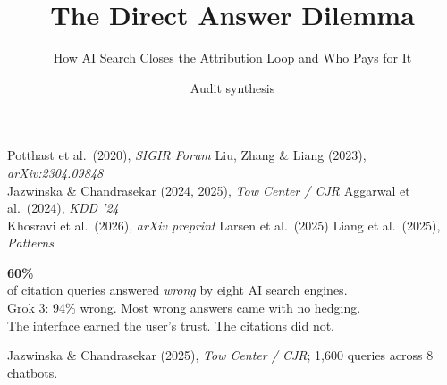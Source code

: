 \documentclass[aspectratio=169,11pt]{beamer}
\title{\textbf{The Direct Answer Dilemma}}
\subtitle{How AI Search Closes the Attribution Loop \textemdash{} and Who Pays for It}
\author{Audit synthesis}
\date{}
\begin{document}
{
\begin{frame}[plain]
\titlepage
\vspace{-0.6cm}
\begin{center}
\footnotesize\textcolor{WarmGray}{%
Potthast et al.\ (2020), \emph{SIGIR Forum} \quad\textbar\quad
Liu, Zhang \& Liang (2023), \emph{arXiv:2304.09848}\\
Jazwinska \& Chandrasekar (2024, 2025), \emph{Tow Center / CJR} \quad\textbar\quad
Aggarwal et al.\ (2024), \emph{KDD '24}\\
Khosravi et al.\ (2026), \emph{arXiv preprint} \quad\textbar\quad
Larsen et al.\ (2025) \quad\textbar\quad
Liang et al.\ (2025), \emph{Patterns}}
\end{center}
\end{frame}}

\begin{frame}[plain]
\vfill
\begin{center}
{\Huge\bfseries\textcolor{DeepRed}{60\%}}\\[0.4cm]
{\large\textcolor{DeepNavy}{of citation queries answered \emph{wrong} by eight AI search engines.}}\\[0.2cm]
{\large\textcolor{DeepNavy}{Grok 3: 94\% wrong. Most wrong answers came with no hedging.}}\\[1.0cm]
{\Large\textcolor{WarmGray}{The interface earned the user's trust. The citations did not.}}
\end{center}
\vfill
\begin{flushright}
\scriptsize\textcolor{WarmGray}{Jazwinska \& Chandrasekar (2025), \emph{Tow Center / CJR}; 1{,}600 queries across 8 chatbots.}
\end{flushright}
\end{frame}
\end{document}
